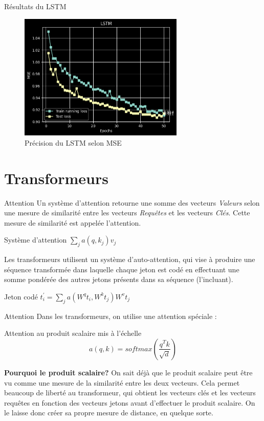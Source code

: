 \documentclass{beamer}
\begin{document}
\begin{frame}{Résultats du LSTM}

\begin{figure} \label{fig:lstm}
    \caption{Précision du LSTM selon MSE} \center
    \includegraphics[width=0.7\textwidth]{images/lstm.png}
\end{figure}

\end{frame}
\section{Transformeurs}

\begin{frame}{Attention}
Un système d'attention retourne une somme des vecteurs \emph{Valeurs} selon 
une mesure de similarité entre les vecteurs \emph{Requêtes} et les vecteurs \emph{Clés}.
Cette mesure de similarité est appelée l'attention.
    \begin{block}{Système d'attention}
        $\sum_{j} a(q, k_j) v_j$
    \end{block}
Les transformeurs utilisent un système d'auto-attention, qui vise à produire
une séquence transformée dans laquelle chaque jeton est codé en effectuant une somme pondérée des
autres jetons présents dans sa séquence (l'incluant).
    \begin{block}{Jeton codé}
        $t_{i}^{'} = \sum_{j} a(W^{q}t_{i}, W^{k}t_j) W^{v}t_j$
    \end{block}
\end{frame}

\begin{frame}{Attention}
Dans les transformeurs, on utilise une attention spéciale :
\begin{block}{Attention au produit scalaire mis à l'échelle}
    \[ a(q, k) = softmax( \frac{q^Tk}{\sqrt{d}}) \]
\end{block}


{\bf Pourquoi le produit scalaire?}
On sait déjà que le produit scalaire peut être vu comme une mesure de la similarité entre
les deux vecteurs. Cela permet beaucoup de liberté au transformeur, qui obtient les vecteurs clés et les vecteurs requêtes en fonction des vecteurs jetons avant d'effectuer le produit scalaire. On le laisse donc créer sa propre mesure de distance, en quelque sorte.

\end{frame}
\end{document}
